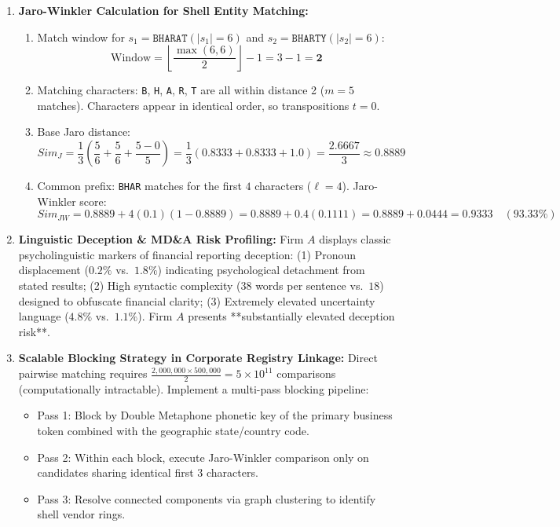 \begin{enumerate}[label=\textbf{P11.\arabic*}]
    \item \textbf{Jaro-Winkler Calculation for Shell Entity Matching:}
    \begin{enumerate}[label=(\alph*)]
        \item Match window for $s_1 = \texttt{BHARAT} (|s_1|=6)$ and $s_2 = \texttt{BHARTY} (|s_2|=6)$:
        \begin{equation*}
        \text{Window} = \left\lfloor \frac{\max(6, 6)}{2} \right\rfloor - 1 = 3 - 1 = \mathbf{2}
        \end{equation*}
        \item Matching characters: \texttt{B}, \texttt{H}, \texttt{A}, \texttt{R}, \texttt{T} are all within distance 2 ($m = 5$ matches). Characters appear in identical order, so transpositions $t = 0$.
        \item Base Jaro distance:
        \begin{equation*}
        Sim_J = \frac{1}{3} \left( \frac{5}{6} + \frac{5}{6} + \frac{5 - 0}{5} \right) = \frac{1}{3} \left( 0.8333 + 0.8333 + 1.0 \right) = \frac{2.6667}{3} \approx \mathbf{0.8889}
        \end{equation*}
        \item Common prefix: \texttt{BHAR} matches for the first $4$ characters ($\ell = 4$). Jaro-Winkler score:
        \begin{equation*}
        Sim_{JW} = 0.8889 + 4(0.1)(1 - 0.8889) = 0.8889 + 0.4(0.1111) = 0.8889 + 0.0444 = \mathbf{0.9333 \quad (93.33\%)}
        \end{equation*}
    \end{enumerate}

    \item \textbf{Linguistic Deception \& MD\&A Risk Profiling:}
    Firm $A$ displays classic psycholinguistic markers of financial reporting deception: (1) Pronoun displacement ($0.2\%$ vs.~$1.8\%$) indicating psychological detachment from stated results; (2) High syntactic complexity ($38$ words per sentence vs.~$18$) designed to obfuscate financial clarity; (3) Extremely elevated uncertainty language ($4.8\%$ vs.~$1.1\%$). Firm $A$ presents **substantially elevated deception risk**.

    \item \textbf{Scalable Blocking Strategy in Corporate Registry Linkage:}
    Direct pairwise matching requires $\frac{2{,}000{,}000 \times 500{,}000}{2} = 5 \times 10^{11}$ comparisons (computationally intractable). Implement a multi-pass blocking pipeline:
    \begin{itemize}
        \item Pass 1: Block by Double Metaphone phonetic key of the primary business token combined with the geographic state/country code.
        \item Pass 2: Within each block, execute Jaro-Winkler comparison only on candidates sharing identical first 3 characters.
        \item Pass 3: Resolve connected components via graph clustering to identify shell vendor rings.
    \end{itemize}
\end{enumerate}

